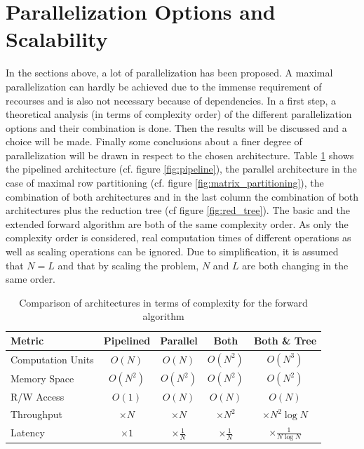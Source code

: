 \documentclass[mscthesis]{usiinfthesis}
\begin{document}
\section{Parallelization Options and Scalability}
\label{ch:analysis_all}

In the sections above, a lot of parallelization has been proposed. A maximal
parallelization can hardly be achieved due to the immense requirement of
recourses and is also not necessary because of dependencies. In a first step,
a theoretical analysis (in terms of complexity order) of the different
parallelization options and their combination is done. Then the results will be
discussed and a choice will be made. Finally some conclusions about a finer
degree of parallelization will be drawn in respect to the chosen architecture.
Table \ref{tab:summary_O} shows the pipelined architecture (cf. figure
\ref{fig:pipeline}), the parallel architecture in the case of maximal row
partitioning (cf. figure \ref{fig:matrix_partitioning}), the combination of
both architectures and in the last column the combination of both architectures
plus the reduction tree (cf figure \ref{fig:red_tree}). The basic and the
extended forward algorithm are both of the same complexity order. As only the
complexity order is considered, real computation times of different operations
as well as scaling operations can be ignored. Due to simplification, it is
assumed that $N=L$ and that by scaling the problem, $N$ and $L$ are both
changing in the same order.

\begin{table}
    \begin{center}
        \begin{tabular}{|l|*{4}{c|}}
            \hline
            Metric & Pipelined & Parallel & Both & Both \& Tree \\
            \hline
            \hline
            Computation Units
            & $O(N)$ & $O(N)$ & $O(N^2)$ & $O(N^3)$ \\
            \hline
            Memory Space
            & $O(N^2)$ & $O(N^2)$ & $O(N^2)$ & $O(N^2)$ \\
            \hline
            R/W Access
            & $O(1)$ & $O(N)$ & $O(N)$ & $O(N)$ \\
            \hline
            \hline
            Throughput
            & $\times N$ & $\times N$ & $\times N^2$ & $\times N^2\log N$ \\
            \hline
            Latency
            & $\times 1$ & $\times \frac{1}{N}$ & $\times \frac{1}{N}$
            & $\times \frac{1}{N\log N}$ \\
            \hline
        \end{tabular}
    \end{center}
    \caption{Comparison of architectures in terms of complexity for the forward
        algorithm}
    \label{tab:summary_O}
\end{table}
\end{document}
